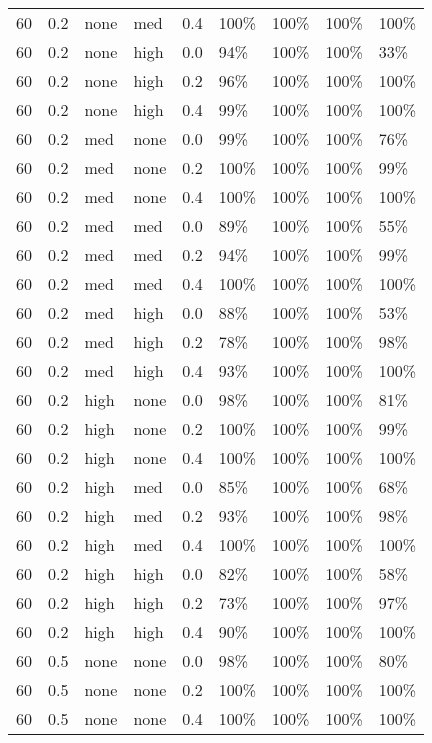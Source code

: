 \begin{longtable}{rrllrllll}
  60 & 0.2 & none & med & 0.4 & 100\% & 100\% & 100\% & 100\% \\ 
  60 & 0.2 & none & high & 0.0 & 94\% & 100\% & 100\% & 33\% \\ 
  60 & 0.2 & none & high & 0.2 & 96\% & 100\% & 100\% & 100\% \\ 
  60 & 0.2 & none & high & 0.4 & 99\% & 100\% & 100\% & 100\% \\ 
  60 & 0.2 & med & none & 0.0 & 99\% & 100\% & 100\% & 76\% \\ 
  60 & 0.2 & med & none & 0.2 & 100\% & 100\% & 100\% & 99\% \\ 
  60 & 0.2 & med & none & 0.4 & 100\% & 100\% & 100\% & 100\% \\ 
  60 & 0.2 & med & med & 0.0 & 89\% & 100\% & 100\% & 55\% \\ 
  60 & 0.2 & med & med & 0.2 & 94\% & 100\% & 100\% & 99\% \\ 
  60 & 0.2 & med & med & 0.4 & 100\% & 100\% & 100\% & 100\% \\ 
  60 & 0.2 & med & high & 0.0 & 88\% & 100\% & 100\% & 53\% \\ 
  60 & 0.2 & med & high & 0.2 & 78\% & 100\% & 100\% & 98\% \\ 
  60 & 0.2 & med & high & 0.4 & 93\% & 100\% & 100\% & 100\% \\ 
  60 & 0.2 & high & none & 0.0 & 98\% & 100\% & 100\% & 81\% \\ 
  60 & 0.2 & high & none & 0.2 & 100\% & 100\% & 100\% & 99\% \\ 
  60 & 0.2 & high & none & 0.4 & 100\% & 100\% & 100\% & 100\% \\ 
  60 & 0.2 & high & med & 0.0 & 85\% & 100\% & 100\% & 68\% \\ 
  60 & 0.2 & high & med & 0.2 & 93\% & 100\% & 100\% & 98\% \\ 
  60 & 0.2 & high & med & 0.4 & 100\% & 100\% & 100\% & 100\% \\ 
  60 & 0.2 & high & high & 0.0 & 82\% & 100\% & 100\% & 58\% \\ 
  60 & 0.2 & high & high & 0.2 & 73\% & 100\% & 100\% & 97\% \\ 
  60 & 0.2 & high & high & 0.4 & 90\% & 100\% & 100\% & 100\% \\ 
  60 & 0.5 & none & none & 0.0 & 98\% & 100\% & 100\% & 80\% \\ 
  60 & 0.5 & none & none & 0.2 & 100\% & 100\% & 100\% & 100\% \\ 
  60 & 0.5 & none & none & 0.4 & 100\% & 100\% & 100\% & 100\% \\ 

\end{longtable}
